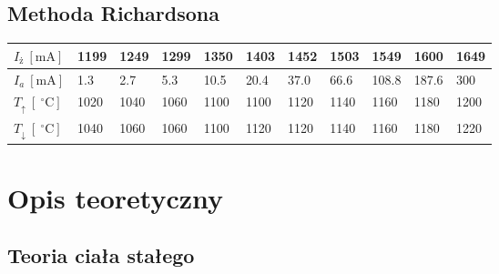 \documentclass[paper=a4, fontsize=12pt]{scrartcl}
\begin{document}
\subsection{Methoda Richardsona}
\begin{table}[h!]
	\begin{tabular}{|l|l|l|l|l|l|l|l|l|l|l|}
		\hline
		$I_\mathrm{ż}\:[\mathrm{mA}]$ & 1199 & 1249 & 1299 & 1350 & 1403 & 1452 & 1503 & 1549  & 1600  & 1649 \\ \hline
		$I_a\:[\mathrm{mA}]$ & 1.3  & 2.7  & 5.3  & 10.5 & 20.4 & 37.0 & 66.6 & 108.8 & 187.6 & 300  \\ \hline
		$T_\uparrow\:[\mathrm{\:^\circ C}]$ & 1020 & 1040 & 1060 & 1100 & 1100 & 1120 & 1140 & 1160  & 1180  & 1200 \\ \hline
		$T_\downarrow\:[\mathrm{\:^\circ C}]$ & 1040 & 1060 & 1060 & 1100 & 1120 & 1120 & 1140 & 1160  & 1180  & 1220 \\ \hline
	\end{tabular}
\end{table}
\section{Opis teoretyczny}
\subsection{Teoria ciała stałego}
\end{document}
